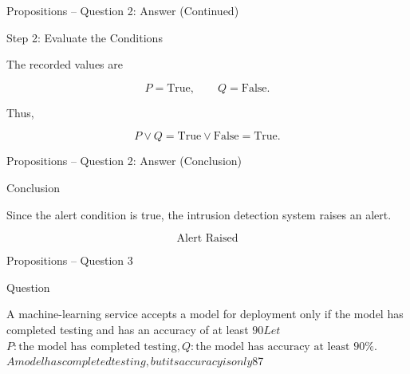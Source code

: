 
\begin{frame}{Propositions -- Question 2: Answer (Continued)}

\begin{exampleblock}{Step 2: Evaluate the Conditions}

The recorded values are

$$
P=\text{True},
\qquad
Q=\text{False}.
$$

Thus,

$$
P\lor Q
=
\text{True}\lor\text{False}
=
\text{True}.
$$

\end{exampleblock}

\end{frame}


\begin{frame}{Propositions -- Question 2: Answer (Conclusion)}

\begin{exampleblock}{Conclusion}

Since the alert condition is true, the intrusion detection system
raises an alert.

$$
\boxed{\text{Alert Raised}}
$$

\end{exampleblock}

\end{frame}


\begin{frame}{Propositions -- Question 3}

\begin{block}{Question}

A machine-learning service accepts a model for deployment only if the
model has completed testing and has an accuracy of at least $90%

Let

$$
P:\text{the model has completed testing},
$$

$$
Q:\text{the model has accuracy at least }90\%.
$$

A model has completed testing, but its accuracy is only $87%

\end{block}

\end{frame}

